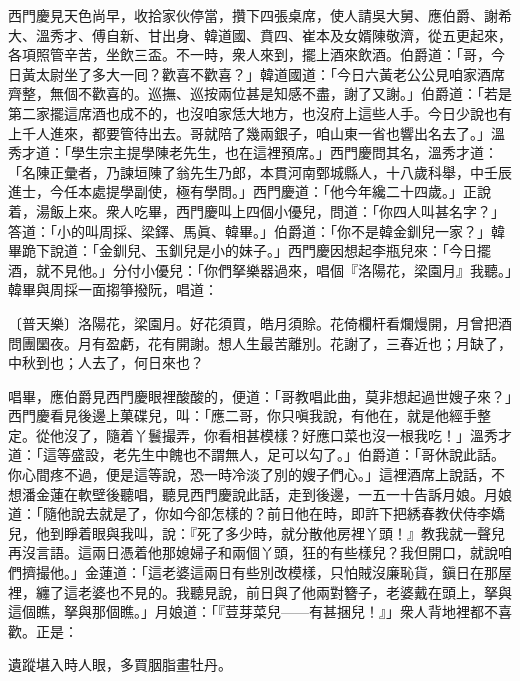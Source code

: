 西門慶見天色尚早，收拾家伙停當，攢下四張桌席，使人請吳大舅、應伯爵、謝希大、溫秀才、傅自新、甘出身、韓道國、賁四、崔本及女婿陳敬濟，從五更起來，各項照管辛苦，坐飲三盃。不一時，衆人來到，擺上酒來飲酒。伯爵道：「哥，今日黃太尉坐了多大一囘？歡喜不歡喜？」韓道國道：「今日六黃老公公見咱家酒席齊整，無個不歡喜的。巡撫、巡按兩位甚是知感不盡，謝了又謝。」伯爵道：「若是第二家擺這席酒也成不的，也沒咱家恁大地方，也沒府上這些人手。今日少說也有上千人進來，都要管待出去。哥就陪了幾兩銀子，咱山東一省也響出名去了。」溫秀才道：「學生宗主提學陳老先生，也在這裡預席。」{}西門慶問其名，溫秀才道：「名陳正彙者，乃諫垣陳了翁先生乃郎，本貫河南鄄城縣人，十八歲科舉，中壬辰進士，今任本處提學副使，極有學問。」西門慶道：「他今年纔二十四歲。」正說着，湯飯上來。衆人吃畢，西門慶叫上四個小優兒，問道：「你四人叫甚名字？」答道：「小的叫周採、梁鐸、馬眞、韓畢。」伯爵道：「你不是韓金釧兒一家？」韓畢跪下說道：「金釧兒、玉釧兒是小的妹子。」西門慶因想起李瓶兒來：「今日擺酒，就不見他。」分付小優兒：「你們拏樂器過來，唱個『洛陽花，梁園月』我聽。」韓畢與周採一面搊箏撥阮，唱道：

\begin{myquote} 
{\markfont\small{〔普天樂〕}}洛陽花，梁園月。好花須買，皓月須賒。花倚欄杆看爛熳開，月曾把酒問團圞夜。月有盈虧，花有開謝。想人生最苦離別。花謝了，三春近也；月缺了，中秋到也；人去了，何日來也？{}
\end{myquote} 

唱畢，應伯爵見西門慶眼裡酸酸的，便道：「哥教唱此曲，莫非想起過世嫂子來？」西門慶看見後邊上菓碟兒，叫：「應二哥，你只嗔我說，有他在，就是他經手整定。從他沒了，隨着丫鬟撮弄，你看相甚模樣？好應口菜也沒一根我吃！」{}溫秀才道：「這等盛設，老先生中餽也不謂無人，足可以勾了。」伯爵道：「哥休說此話。你心間疼不過，便是這等說，恐一時冷淡了別的嫂子們心。」{}這裡酒席上說話，不想潘金蓮在軟壁後聽唱，聽見西門慶說此話，走到後邊，一五一十告訴月娘。月娘道：「隨他說去就是了，你如今卻怎樣的？前日他在時，即許下把綉春教伏侍李嬌兒，他到睜着眼與我叫，說：『死了多少時，就分散他房裡丫頭！』教我就一聲兒再沒言語。這兩日憑着他那媳婦子和兩個丫頭，狂的有些樣兒？我但開口，就說咱們擠撮他。」金蓮道：「這老婆這兩日有些別改模樣，只怕賊沒廉恥貨，鎭日在那屋裡，纏了這老婆也不見的。我聽見說，前日與了他兩對簪子，老婆戴在頭上，拏與這個瞧，拏與那個瞧。」月娘道：「『荳芽菜兒——有甚捆兒！』」衆人背地裡都不喜歡。正是：

\begin{myquote} 
遺蹤堪入時人眼，多買胭脂畫牡丹。
\end{myquote} 

